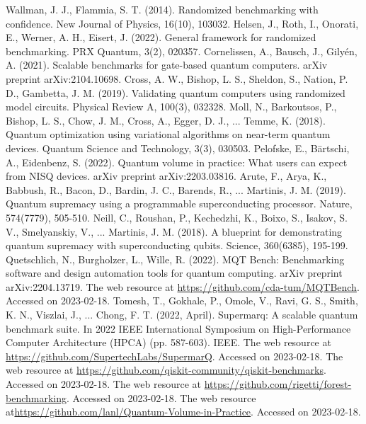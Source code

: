 \documentclass[preprint,12pt, a4paper, dvipsnames]{elsarticle}
\newcommand{\1}{{\rm 1\hspace{-0.9mm}l}}
\theoremstyle{definition}
\begin{document}
\begin{thebibliography}{00}
 Wallman, J. J.,  Flammia, S. T. (2014). Randomized benchmarking with confidence. New Journal of Physics, 16(10), 103032.
 Helsen, J., Roth, I., Onorati, E., Werner, A. H.,  Eisert, J. (2022). General framework for randomized benchmarking. PRX Quantum, 3(2), 020357.
 Cornelissen, A., Bausch, J.,  Gilyén, A. (2021). Scalable benchmarks for gate-based quantum computers. arXiv preprint arXiv:2104.10698.
Cross, A. W., Bishop, L. S., Sheldon, S., Nation, P. D., Gambetta, J. M. (2019). Validating quantum computers using randomized model circuits. Physical Review A, 100(3), 032328.
Moll, N., Barkoutsos, P., Bishop, L. S., Chow, J. M., Cross, A., Egger, D. J., ...  Temme, K. (2018). Quantum optimization using variational algorithms on near-term quantum devices. Quantum Science and Technology, 3(3), 030503.
 Pelofske, E., B{\"a}rtschi, A., Eidenbenz, S. (2022). Quantum volume in practice: What users can expect from NISQ devices. arXiv preprint arXiv:2203.03816.
 Arute, F., Arya, K., Babbush, R., Bacon, D., Bardin, J. C., Barends, R., ... Martinis, J. M. (2019). Quantum supremacy using a programmable superconducting processor. Nature, 574(7779), 505-510.
Neill, C., Roushan, P., Kechedzhi, K., Boixo, S., Isakov, S. V., Smelyanskiy, V., ...  Martinis, J. M. (2018). A blueprint for demonstrating quantum supremacy with superconducting qubits. Science, 360(6385), 195-199.
	 Quetschlich, N., Burgholzer, L., Wille, R. (2022). MQT Bench: Benchmarking software and design automation tools for quantum computing. arXiv preprint arXiv:2204.13719.
 The web resource at  \url{https://github.com/cda-tum/MQTBench}. Accessed on 2023-02-18.
	 Tomesh, T., Gokhale, P., Omole, V., Ravi, G. S., Smith, K. N., Viszlai, J., ...  Chong, F. T. (2022, April). Supermarq: A scalable quantum benchmark suite. In 2022 IEEE International Symposium on High-Performance Computer Architecture (HPCA) (pp. 587-603). IEEE.
 The web resource at \url{https://github.com/SupertechLabs/SupermarQ}. Accessed on 2023-02-18.
 The web resource at
\url{https://github.com/qiskit-community/qiskit-benchmarks}. Accessed on 2023-02-18.
 The web resource at \url{https://github.com/rigetti/forest-benchmarking}. Accessed on 2023-02-18.
 The web resource at\url{https://github.com/lanl/Quantum-Volume-in-Practice}. Accessed on 2023-02-18.

\end{thebibliography}
\end{document}
